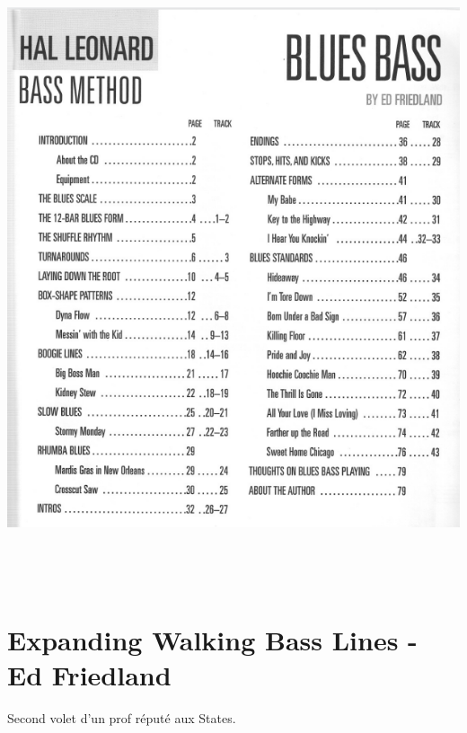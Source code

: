 \documentclass[a4paper]{book}
\begin{document}
\begin{center}
\includegraphics[width=16.191cm,height=18.597cm]{lebluessupportsmethodes-img152.png}
\end{center}
\clearpage\section{Expanding Walking Bass Lines - Ed Friedland}
Second volet d{\textquoteright}un prof r\'eput\'e aux States.
\end{document}
